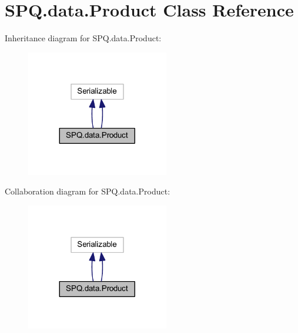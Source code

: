 \hypertarget{class_s_p_q_1_1data_1_1_product}{}\section{S\+P\+Q.\+data.\+Product Class Reference}
\label{class_s_p_q_1_1data_1_1_product}


Inheritance diagram for S\+P\+Q.\+data.\+Product\+:\nopagebreak
\begin{figure}[H]
\begin{center}
\leavevmode
\includegraphics[width=176pt]{class_s_p_q_1_1data_1_1_product__inherit__graph}
\end{center}
\end{figure}


Collaboration diagram for S\+P\+Q.\+data.\+Product\+:\nopagebreak
\begin{figure}[H]
\begin{center}
\leavevmode
\includegraphics[width=176pt]{class_s_p_q_1_1data_1_1_product__coll__graph}
\end{center}
\end{figure}
